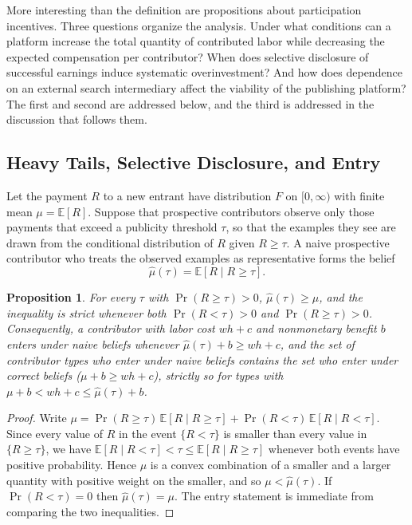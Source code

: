 \documentclass[11pt]{article}
\newtheorem{proposition}{Proposition}
\theoremstyle{remark}
\begin{document}
More interesting than the definition are propositions about participation incentives. Three questions organize the analysis. Under what conditions can a platform increase the total quantity of contributed labor while decreasing the expected compensation per contributor? When does selective disclosure of successful earnings induce systematic overinvestment? And how does dependence on an external search intermediary affect the viability of the publishing platform? The first and second are addressed below, and the third is addressed in the discussion that follows them.

\subsection{Heavy Tails, Selective Disclosure, and Entry}

Let the payment $R$ to a new entrant have distribution $F$ on $[0,\infty)$ with finite mean $\mu = \mathbb{E}[R]$. Suppose that prospective contributors observe only those payments that exceed a publicity threshold $\tau$, so that the examples they see are drawn from the conditional distribution of $R$ given $R \ge \tau$. A naive prospective contributor who treats the observed examples as representative forms the belief
\begin{equation}
\hat{\mu}(\tau) = \mathbb{E}[R \mid R \ge \tau].
\end{equation}

\begin{proposition}\label{prop:overentry}
For every $\tau$ with $\Pr(R \ge \tau) > 0$, $\hat{\mu}(\tau) \ge \mu$, and the inequality is strict whenever both $\Pr(R<\tau)>0$ and $\Pr(R\ge\tau)>0$. Consequently, a contributor with labor cost $w h + c$ and nonmonetary benefit $b$ enters under naive beliefs whenever $\hat{\mu}(\tau) + b \ge w h + c$, and the set of contributor types who enter under naive beliefs contains the set who enter under correct beliefs ($\mu + b \ge w h + c$), strictly so for types with $\mu + b < w h + c \le \hat{\mu}(\tau) + b$.
\end{proposition}

\begin{proof}
Write $\mu = \Pr(R\ge\tau)\,\mathbb{E}[R\mid R\ge\tau] + \Pr(R<\tau)\,\mathbb{E}[R\mid R<\tau]$. Since every value of $R$ in the event $\{R<\tau\}$ is smaller than every value in $\{R\ge\tau\}$, we have $\mathbb{E}[R\mid R<\tau] < \tau \le \mathbb{E}[R\mid R\ge\tau]$ whenever both events have positive probability. Hence $\mu$ is a convex combination of a smaller and a larger quantity with positive weight on the smaller, and so $\mu < \hat{\mu}(\tau)$. If $\Pr(R<\tau)=0$ then $\hat{\mu}(\tau)=\mu$. The entry statement is immediate from comparing the two inequalities.
\end{proof}
\end{document}
